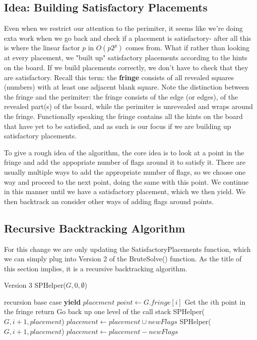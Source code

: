 \documentclass{article}
\theoremstyle{definition}
\theoremstyle{definition}
\theoremstyle{theorem}
\begin{document}
	\subsection{Idea: Building Satisfactory Placements}
	Even when we restrict our attention to the perimiter, it seems like we're doing exta work when we go back and check if a placement is satisfactory- after all this is where the linear factor $p$ in $O(p2^{p})$ comes from. What if rather than looking at every placement, we "built up" satisfactory placements according to the hints on the board. If we build placements correctly, we don't have to check that they are satisfactory. Recall this term: the \textbf{fringe} consists of all revealed squares (numbers) with at least one adjacent blank square. Note the distinction between the fringe and the perimiter: the fringe consists of the edge (or edges), of the revealed part(s) of the board, while the perimiter is unrevealed and wraps around the fringe. Functionally speaking the fringe contains all the hints on the board that have yet to be satisfied, and as such is our focus if we are building up satisfactory placements.
	
	To give a rough idea of the algorithm, the core idea is to look at a point in the fringe and add the appopriate number of flags around it to satisfy it. There are usually multiple ways to add the appropriate number of flags, so we choose one  way and proceed to the next point, doing the same with this point. We continue in this manner until we have a satisfactory placement, which we then yield. We then backtrack an consider other ways of adding flags around points.
	
	\subsection{Recursive Backtracking Algorithm}
	For this change we are only updating the SatisfactoryPlacements function, which we can simply plug into Version 2 of the BruteSolve() function. As the title of this section implies, it is a recursive backtracking algorithm.
	
	\begin{algorithmic}
		 \Comment Version 3
		\State SPHelper($G,0, \emptyset$)
		\EndFunction
		
		 \Comment recursion base case
		\State \textbf{yield} $placement$
		\EndIf
		\State $point \gets G.fringe[i]$ \Comment Get the $i$th point in the fringe
		\State return \Comment Go back up one level of the call stack
		\State SPHelper($G, i+1, placement$)
		\Else
		\State $placement \gets placement \cup newFlags$
		\State SPHelper($G, i+1, placement$)
		\State $placement \gets placement - newFlags$
		\EndFor
		\EndIf
		
		\EndFunction
	\end{algorithmic}
\end{document}
